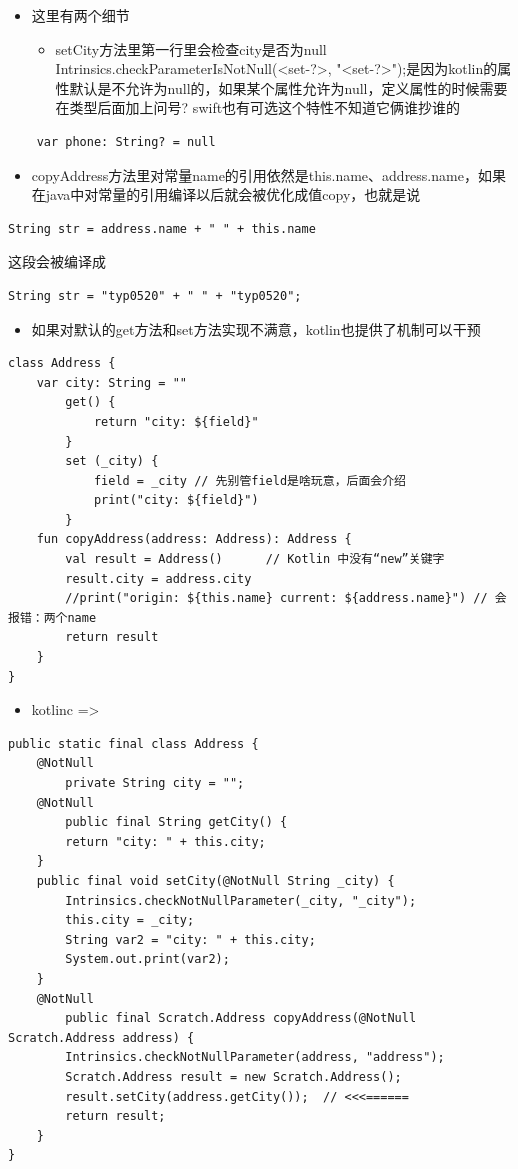 \documentclass[9pt, b5paper]{article}
\begin{document}
\begin{itemize}
\item 这里有两个细节
\begin{itemize}
\item setCity方法里第一行里会检查city是否为null Intrinsics.checkParameterIsNotNull(<set-?>, "<set-?>");是因为kotlin的属性默认是不允许为null的，如果某个属性允许为null，定义属性的时候需要在类型后面加上问号? swift也有可选这个特性不知道它俩谁抄谁的
\end{itemize}
\end{itemize}
\begin{verbatim}
    var phone: String? = null
\end{verbatim}
\begin{itemize}
\item copyAddress方法里对常量name的引用依然是this.name、address.name，如果在java中对常量的引用编译以后就会被优化成值copy，也就是说
\end{itemize}
\begin{verbatim}
String str = address.name + " " + this.name
\end{verbatim}
这段会被编译成
\begin{verbatim}
String str = "typ0520" + " " + "typ0520";
\end{verbatim}
\begin{itemize}
\item 如果对默认的get方法和set方法实现不满意，kotlin也提供了机制可以干预
\end{itemize}
\begin{verbatim}
class Address {
    var city: String = ""
        get() {
            return "city: ${field}"
        }
        set (_city) {
            field = _city // 先别管field是啥玩意，后面会介绍
            print("city: ${field}")
        }
    fun copyAddress(address: Address): Address {
        val result = Address()      // Kotlin 中没有“new”关键字
        result.city = address.city
        //print("origin: ${this.name} current: ${address.name}") // 会报错：两个name
        return result
    }
}
\end{verbatim}
\begin{itemize}
\item kotlinc =>
\end{itemize}
\begin{verbatim}
public static final class Address {
    @NotNull
        private String city = "";
    @NotNull
        public final String getCity() {
        return "city: " + this.city;
    }
    public final void setCity(@NotNull String _city) {
        Intrinsics.checkNotNullParameter(_city, "_city");
        this.city = _city;
        String var2 = "city: " + this.city;
        System.out.print(var2);
    }
    @NotNull
        public final Scratch.Address copyAddress(@NotNull Scratch.Address address) {
        Intrinsics.checkNotNullParameter(address, "address");
        Scratch.Address result = new Scratch.Address();
        result.setCity(address.getCity());  // <<<======
        return result;
    }
}
\end{verbatim}
\end{document}
